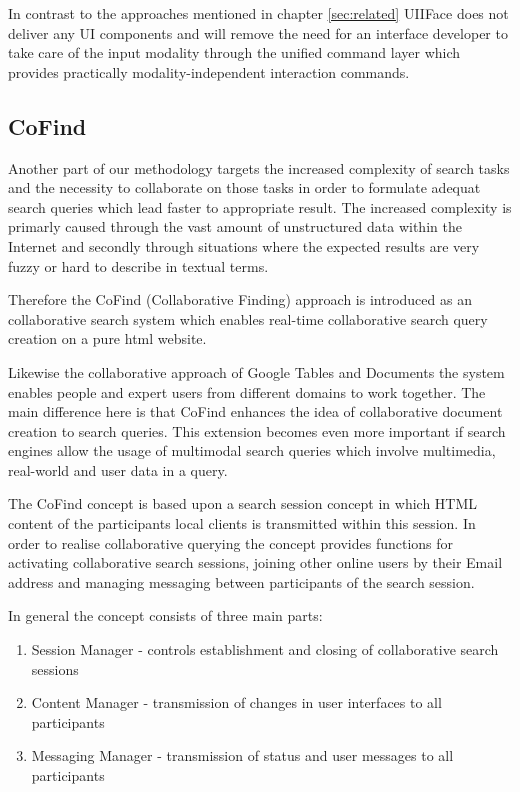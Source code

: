 \documentclass[runningheads,a4paper]{llncs} \usepackage[utf8]{inputenc}
\begin{document}
In contrast to the approaches mentioned in chapter \ref{sec:related}
UIIFace does not deliver any UI components and will remove the need for an
interface developer to take care of the input modality through the unified
command layer which provides practically modality-independent interaction
commands.

\subsection{CoFind}

Another part of our methodology targets the increased complexity of search
tasks and the necessity to collaborate on those tasks in order to formulate
adequat search queries which lead faster to appropriate result. The increased
complexity is primarly caused through the vast amount of unstructured data 
within the Internet and secondly through situations where the expected results
are very fuzzy or hard to describe in textual terms. 

Therefore the CoFind (Collaborative Finding) approach is introduced as an
collaborative search system which enables real-time collaborative search query
creation on a pure html website.

Likewise the collaborative approach of Google Tables and Documents the
system enables people and expert users from different domains to work together.
The main difference here is that CoFind enhances the idea of collaborative document
creation to search queries. This extension becomes even more important if
search engines allow the usage of multimodal search queries which
involve multimedia, real-world and user data in a query. 

The CoFind concept is based upon a search session concept in which HTML content
of the participants local clients is transmitted within this session.
In order to realise collaborative querying the concept provides functions for
activating collaborative search sessions, joining other online users by their
Email address and managing messaging between participants of the search session.

In general the concept consists of three main parts:
\begin{enumerate}
  \item Session Manager - controls establishment and closing of collaborative
  search sessions
  \item Content Manager - transmission of changes in user interfaces to all
  participants
  \item Messaging Manager - transmission of status and user messages to all
  participants
\end{enumerate}
\end{document}
